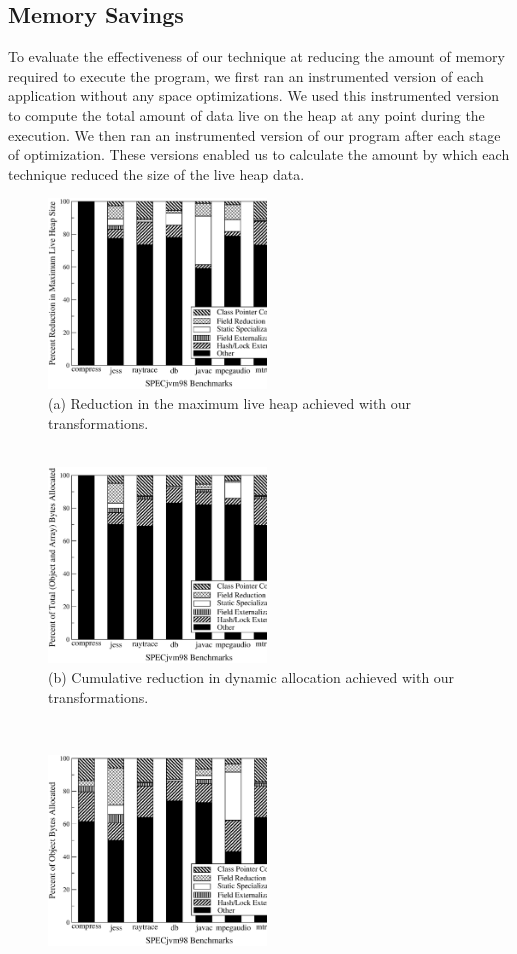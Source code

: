\documentclass[oribibl]{llncs}
\begin{document}
\subsection{Memory Savings}
%
To evaluate the effectiveness of our technique at reducing the
amount of memory required to execute the program, 
we first ran an instrumented version of each
application without any space optimizations. We used this
instrumented version to compute the total amount of data live on the
heap at any point during the execution.  
We then ran an instrumented version of our program after each stage of
optimization.
These versions enabled us to calculate the amount by which each 
technique reduced the size of the live heap data.

\begin{figure}
\begin{center}
\parbox[b]{6cm}{\centering%
\includegraphics[width=5.8cm,clip=true]{Figures/sas-ttllive.eps}\\
(a) Reduction in the maximum live heap achieved with our transformations.
\\~}%
\parbox[b]{6cm}{\centering%
\includegraphics[width=5.8cm,clip=true]{Figures/sas-ttlalloc.eps}\\
(b) Cumulative reduction in dynamic allocation achieved with
    our transformations.
}%
\\[.3cm]
\parbox[b]{6cm}{\centering%
\includegraphics[width=5.8cm,clip=true]{Figures/sas-objalloc.eps}\\
}
\end{center}
\end{figure}
\end{document}
